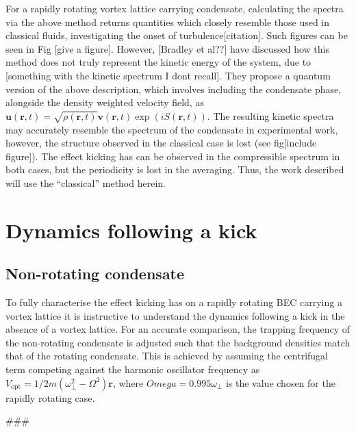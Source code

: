For a rapidly rotating vortex lattice carrying condensate, calculating the spectra via the above method returns quantities which closely resemble those used in classical fluids, investigating the onset of turbulence[citation]. Such figures can be seen in Fig [give a figure]. However, [Bradley et al??] have discussed how this method does not truly represent the kinetic energy of the system, due to [something with the kinetic spectrum I dont recall]. They propose a quantum version of the above description, which involves including the condensate phase, alongside the density weighted velocity field, as $\mathbf{u}(\mathbf{r},t) = \sqrt{\rho(\mathbf{r},t)}\mathbf{v}(\mathbf{r},t)\exp\left(iS(\mathbf{r},t)\right)$. The resulting kinetic spectra may accurately resemble the spectrum of the condensate in experimental work, however, the structure observed in the classical case is lost (see fig[include figure]). The effect kicking has can be observed in the compressible spectrum in both cases, but the periodicity is lost in the averaging. Thus, the work described will use the ``classical'' method herein.

\section{Dynamics following a kick}\label{sec:kickvl}
\subsection{Non-rotating condensate}
To fully characterise the effect kicking has on a rapidly rotating BEC carrying a vortex lattice it is instructive to understand the dynamics following a kick in the absence of a vortex lattice. For an accurate comparison, the trapping frequency of the non-rotating condensate is adjusted such that the background densities match that of the rotating condensate. This is achieved by assuming the centrifugal term competing against the harmonic oscillator frequency as $V_{\text{opt}} = 1/2m(\omega^2_\perp - \Omega^2)\mathbf
{r}$, where $Omega=0.995\omega_\perp$ is the value chosen for the rapidly rotating case.

###

